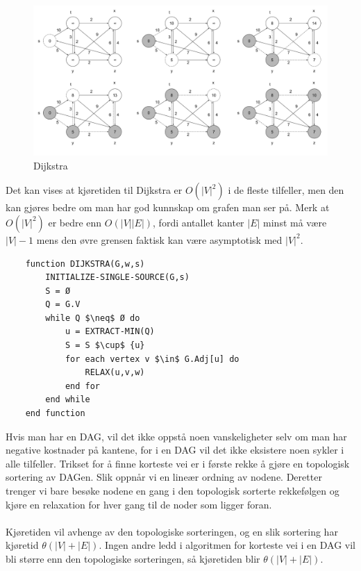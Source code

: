 \begin{figure}[H]
\includegraphics[scale=0.3]{images/dijstra}
\centering %
\caption{Dijkstra}
\label{fig:dijkstra}
\end{figure}

\noindent Det kan vises at kjøretiden til Dijkstra er $O(|V|^2)$ i de fleste tilfeller, men den kan gjøres bedre om man har god kunnskap om grafen man ser på. Merk at $O(|V|^2)$ er bedre enn $O(|V||E|)$, fordi antallet kanter $|E|$ minst må være $|V| - 1$ mens den øvre grensen faktisk kan være asymptotisk med $|V|^2$.

\begin{lstlisting}
    function DIJKSTRA(G,w,s)
	    INITIALIZE-SINGLE-SOURCE(G,s)
    	S = Ø
    	Q = G.V
    	while Q $\neq$ Ø do
    		u = EXTRACT-MIN(Q)
    		S = S $\cup$ {u}
    		for each vertex v $\in$ G.Adj[u] do
    			RELAX(u,v,w)
    		end for
    	end while
    end function
\end{lstlisting}

\noindent Hvis man har en DAG, vil det ikke oppstå noen vanskeligheter selv om man har negative kostnader på kantene, for i en DAG vil det ikke eksistere noen sykler i alle tilfeller. Trikset for å finne korteste vei er i første rekke å gjøre en topologisk sortering av DAGen. Slik oppnår vi en lineær ordning av nodene. Deretter trenger vi bare besøke nodene en gang i den topologisk sorterte rekkefølgen og kjøre en relaxation for hver gang til de noder som ligger foran. 
\\\\
Kjøretiden vil avhenge av den topologiske sorteringen, og en slik sortering har kjøretid $\theta(|V|+|E|)$. Ingen andre ledd i algoritmen for korteste vei i en DAG vil bli større enn den topologiske sorteringen, så kjøretiden blir $\theta(|V|+|E|)$.\\

